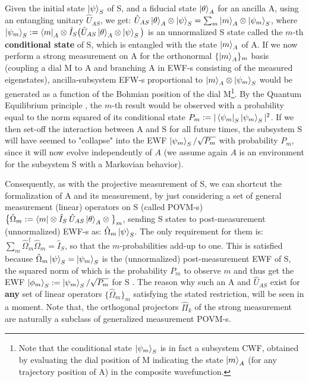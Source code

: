 \documentclass[11pt, a4paper]{article} %
\begin{document}
Given the initial state $\ket{\psi}_S$ of S, and a fiducial state $\ket{\theta}_A$ for an ancilla A, using an entangling unitary $\hat{U}_{AS}$, we get: $\hat{U}_{AS}\ket{\theta}_A\otimes\ket{\psi}_S=\sum_m \ket{m}_A\otimes \ket{\psi_m}_S$, where $\ket{\psi_m}_S:=\bra{m}_A\otimes\hat{I}_S \big(\hat{U}_{AS}\ket{\theta}_A\otimes\ket{\psi}_S\big)$ is an unnormalized S state called the $m$-th {\bf conditional state} of S, which is entangled with the state $\ket{m}_A$ of A. If we now perform a strong measurement on A for the orthonormal $\{\ket{m}_A\}_m$ basis (coupling a dial M to A and branching A in EWF-s consisting of the measured eigenstates), ancilla-subsystem EFW-s proportional to $\ket{m}_A\otimes \ket{\psi_m}_S$ would be generated as a function of the Bohmian position of the dial M\footnote{Note that the conditional state $\ket{\psi_m}_S$ is in fact a subsystem CWF, obtained by evaluating the dial position of M indicating the state $\ket{m}_A$ (for any trajectory position of A) in the composite wavefunction.}. By the Quantum Equilibrium principle \cite{Absolute}, the $m$-th result would be observed with a probability equal to the norm squared of its conditional state $P_m:=|\bra{\psi_m}_S\ket{\psi_m}_S|^2$. If we then set-off the interaction between A and S for all future times, the subsystem S will have seemed to "collapse" into the EWF $\ket{\psi_m}_S/\sqrt{P_m}$ with probability $P_m$, since it will now evolve independently of $A$ (we assume again $A$ is an environment for the subsystem S with a Markovian behavior). %

Consequently, as with the projective measurement of S, we can shortcut the formalization of A and its measurement, by just considering a set of general measurement (linear) operators on S (called POVM-s) $\big\{\hat{\Omega}_m:=\bra{m}\otimes\hat{I}_S\:\hat{U}_{AS}\ket{\theta}_A\otimes\big\}_m$, sending S states to post-measurement (unnormalized) EWF-s as: $\hat{\Omega}_m\ket{\psi}_S$. The only requirement for them is: $\sum_m \hat{\Omega}_m^\dagger\hat{\Omega}_m=\hat{I}_S$, so that the $m$-probabilities add-up to one. This is satisfied because $\hat{\Omega}_m\ket{\psi}_S=\ket{\psi_m}_S$ is the (unnormalized) post-measurement EWF of S, the squared norm of which is the probability $P_m$ to observe $m$ and thus get the EWF $\ket{\phi_m}_S:=\ket{\psi_m}_S/\sqrt{P_m}$ for S \cite{Generalized, Durr}. The reason why such an A and $\hat{U}_{AS}$  exist for {\bf any} set of linear operators $\{\hat{\Omega}_m\}_m$ satisfying the stated restriction, will be seen in a moment. Note that, the orthogonal projectors $\hat{\Pi}_k$ of the strong measurement are naturally a subclass of generalized measurement POVM-s.\vspace{-0.15cm}
\end{document}
